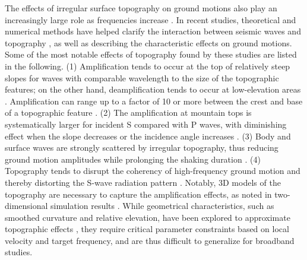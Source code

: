 The effects of irregular surface topography on ground motions also play an increasingly large role as frequencies increase . In recent studies, theoretical and numerical methods have helped clarify the interaction between seismic waves and topography \citep[mainly scattering and trapping of waves, e.g.,][]{imperatoriRoleTopographyLateral2015,takemura2015scattering,rodgersBroadband04Hz2018}, as well as describing the characteristic effects on ground motions. Some of the most notable effects of topography found by these studies are listed in the following. (1) Amplification tends to occur at the top of relatively steep slopes for waves with comparable wavelength to the size of the topographic features; on the other hand, deamplification tends to occur at low-elevation areas \citep{trifunacAnalysisPacoimaDam1971,booreNoteEffectSimple1972,spudichDirectionalTopographicSite1996,bouchonSeismicResponseHill1996,assimakiSoilDependentTopographicEffects2005}. Amplification can range up to a factor of 10 or more between the crest and base of a topographic feature \citep{davisObservedEffectsTopography1973,geliEffectTopographyEarthquake1988,umedaHighAccelerationsProduced1987,gaffetSiteEffectStudy2000}. (2) The amplification at mountain tops is systematically larger for incident S compared with P waves, with diminishing effect when the slope decreases or the incidence angle increases \citep{bardDiffractedWavesDisplacement1982}. (3) Body and surface waves are strongly scattered by irregular topography, thus reducing ground motion amplitudes while prolonging the shaking duration \citep{sanchez-sesmaDiffractionSVRayleigh1991,leeEffectsRealisticSurface2009}. (4) Topography tends to disrupt the coherency of high-frequency ground motion and thereby distorting the S-wave radiation pattern \citep{imperatoriRoleTopographyLateral2015}. Notably, 3D models of the topography are necessary to capture the amplification effects, as noted in two-dimensional simulation results \citep{geliEffectTopographyEarthquake1988,bouchonSeismicResponseHill1996}. While geometrical characteristics, such as smoothed curvature and relative elevation, have been explored to approximate topographic effects , they require critical parameter constraints based on local velocity and target frequency, and are thus difficult to generalize for broadband studies.

